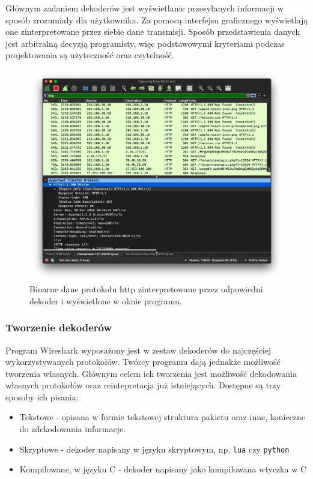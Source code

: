 \documentclass[a4paper, 12pt, twoside, openright]{article}
\begin{document}
	Głównym zadaniem dekoderów jest wyświetlanie przesyłanych informacji w sposób zrozumiały dla użytkownika. Za pomocą
	interfejsu graficznego wyświetlają one zinterpretowane przez siebie dane transmisji. Sposób przedstawienia danych
	jest arbitralną decyzją programisty, więc podstawowymi kryteriami podczas projektowania są użyteczność oraz czytelność.

	\begin{figure}[ht]
		\centering
			\includegraphics[width=1.0\textwidth]{img/screenshot_fis_http.png}
		\caption{Binarne dane protokołu http zinterpretowane przez odpowiedni dekoder i wyświetlone w oknie programu.}
		\label{fig:fis_http}
	\end{figure}

	\newpage
	\subsubsection{Tworzenie dekoderów}
	\indent\par
	Program Wireshark wyposażony jest w zestaw dekoderów do najczęściej wykorzystywanych protokołów. Twórcy programu
	dają jednakże możliwość tworzenia własnych. Głównym celem ich tworzenia jest możliwość
	dekodowania własnych protokołów oraz reintepretacja już istniejących. Dostępne są trzy sposoby ich pisania:
	\begin{itemize}
		\item Tekstowe - opisana w formie tekstowej struktura pakietu oraz inne, konieczne do zdekodowania informacje.
		\item Skryptowe - dekoder napisany w języku skryptowym, np. \texttt{lua} czy \texttt{python}
		\item Kompilowane, w języku C - dekoder napisany jako kompilowana wtyczka w C
	\end{itemize}
\end{document}
